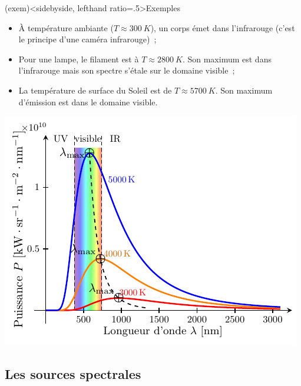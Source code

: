 \documentclass[../../main/main.tex]{subfiles}
\begin{document}
\begin{tcb}(exem)<sidebyside, lefthand ratio=.5>{Exemples}
	\begin{itemize}
		\item À température ambiante ($T \approx \SI{300}{K}$), un corps émet
		      dans l'infrarouge (c'est le principe d'une caméra infrarouge)~;
		\item Pour une lampe, le filament est à $T \approx \SI{2800}{K}$. Son
		      maximum est dans l'infrarouge mais son spectre s'étale sur le
		      domaine visible~;
		\item La température de surface du Soleil est de $T \approx
			      \SI{5700}{K}$. Son maximum d'émission est dans le domaine visible.
	\end{itemize}
	\begin{center}
		\pgfspectra[element={H,Fe,Mg,Na},
		absorption, line intensity=40, Imin=.05,
		axis, axis color=white, axis font color=black,
		axis ticks=4, axis unit precision=2,
		axis label text={Longueur d'onde [$\si{nm}$]},
		back=visible10,
		]
		\label{fig:spec_sun}
	\end{center}
	\tcblower
	\begin{center}
		\includegraphics[width=\linewidth]{blackbody}
		\label{fig:cps_chaud}
	\end{center}
\end{tcb}

\subsection{Les sources spectrales}
\end{document}
